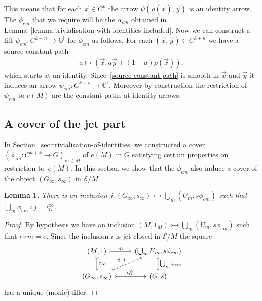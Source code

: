 \documentclass[10pt,a4paper]{amsart}
\numberwithin{equation}{section}
\newtheorem{Lemma}[Theorem]{Lemma}
\begin{document}
This means that for each $\vec{x}\in C^k$ the arrow $\psi(\rho(\vec{x}),\vec{y})$ is an identity arrow. The $\phi_{em}$ that we require will be the $\alpha_{em}$ obtained in Lemma~\ref{lemma:trivialisation-with-identities-included}. Now we can construct a lift $\psi_{em}\colon C^{k+n} \rightarrow \mathbb{G}^{\mathbb{I}}$ for $\phi_{em}$ as follows. For each $(\vec{x},\vec{y})\in C^{k+n}$ we have a source constant path
\begin{gather}\label{source-constant-path}
 a \mapsto (\vec{x}, a\vec{y}+(1-a)\rho(\vec{x})),
\end{gather}
which starts at an identity. Since~\eqref{source-constant-path} is smooth in $\vec{x}$ and $\vec{y}$ it induces an arrow $\psi_{em}\colon C^{k+n} \rightarrow \mathbb{G}^{\mathbb{I}}$. Moreover by construction the restriction of $\psi_{em}$ to $e(M)$ are the constant paths at identity arrows.

\subsection{A cover of the jet part}\label{sec:cover-of-jet-part}

In Section~\ref{sec:trivialisation-of-identities} we constructed a cover $(\phi_{em}\colon C^{n+k}\rightarrow G)_{m\in M}$ of $e(M)$ in $G$ satisfying certain properties on restriction to~$e(M)$. In this section we show that the $\phi_{em}$ also induce a cover of the object $(G_{\infty},s_{\infty})$ in $\mathcal{E}/M$.

\begin{Lemma}\label{lemma:Lifting Cover to Ginfty}
There is an inclusion $j\colon (G_{\infty},s_{\infty})\rightarrowtail \bigcup_{m}(U_{m},s\phi_{em})$ such that $\bigcup_m \phi_{em} \circ j=\iota_{G}^{\infty}$.
\end{Lemma}
\begin{proof}
By hypothesis we have an inclusion $(M,1_M)\rightarrowtail \bigcup_{m}(U_{m},s\phi_{em})$ such that $\iota\circ m=e$. Since the inclusion $\iota$ is jet closed in $\mathcal{E}/M$ the square
\begin{equation*}\begin{tikzcd}
(M,1) \dar[rightarrowtail]{e_{\infty}} \rar[rightarrowtail]{m} & (\bigcup_{m}U_{m},s\phi_{em}) \dar[rightarrowtail]{\bigcup_m \phi_{em}} \\
(G_{\infty},s_{\infty}) \urar[rightarrowtail,dashed]{\exists !\, j} \rar[rightarrowtail]{\iota_{G}^{\infty}} & (G,s)
\end{tikzcd}\end{equation*}
has a unique (monic) f\/iller.
\end{proof}
\end{document}
